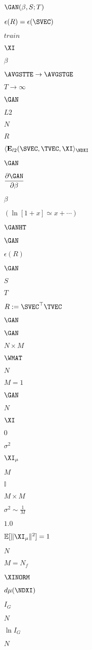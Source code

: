 $\GAN(\beta,S;T)$

$\epsilon(R)=\epsilon(\SVEC)$

$train$

$\XI$

$\beta$

$\AVGSTTE\rightarrow\AVGSTGE$

$T\rightarrow\infty$

$\GAN$

$L2$

$N$

$R$

$\langle  \mathbf{E}_{l2}(\SVEC,\TVEC,\XI \rangle_{\NDXI}$

$\GAN$

$\dfrac{\partial \GAN}{\partial \beta}$

$\beta$

$(\ln[1+x]\simeq x+\cdots)$

$\GANHT$

$\GAN$

$\epsilon(R)$

$\GAN$

$S$

$T$

$R:=\SVEC^{\top}\TVEC$

$\GAN$

$\GAN$

$N \times M$

$\WMAT$

$N$

$M=1$

$\GAN$

$N$

$\XI$

$0$

$\sigma^{2}$

$\XI_{\mu}$

$M$

$\mathbb{I}$

$M \times M$

$\sigma^{2}\sim\tfrac{1}{M}$

$1.0$

$\mathbb{E}[\Vert \XI_{\mu} \Vert^2]=1$

$N$

$M=N_f$

$\XINORM$

$d\mu(\NDXI)$

$I_G$

$N$

$\ln I_G$

$N$

